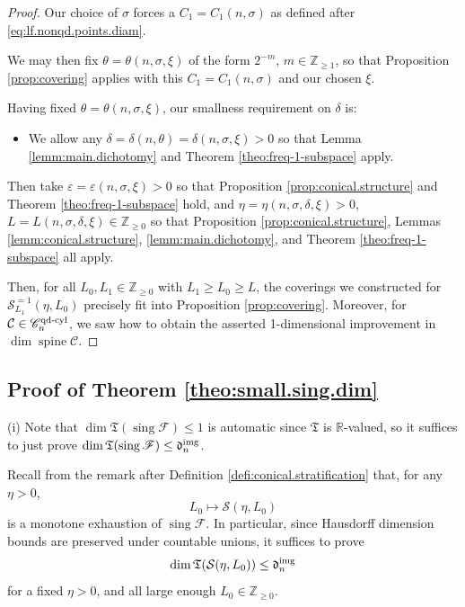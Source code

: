 \documentclass[11pt, letterpaper, reqno]{amsart}
\numberwithin{equation}{section}
\theoremstyle{remark}
\newcommand{\RR}{\mathbb{R}}
\newcommand{\ZZ}{\mathbb{Z}}
\newcommand{\cC}{\mathcal{C}}
\newcommand{\cS}{\mathcal{S}}
\newcommand{\frT}{\mathfrak{T}}
\newcommand{\sing}{\operatorname{sing}}
\newcommand{\spine}{\operatorname{spine}}
\newcommand{\eps}{\varepsilon}
\begin{document}
\begin{proof}
    Our choice of $\sigma$ forces a $C_1 = C_1(n, \sigma)$ as defined after \eqref{eq:lf.nonqd.points.diam}. 
    
    We may then fix $\theta = \theta(n, \sigma, \xi)$ of the form $2^{-m}$, $m \in \ZZ_{\geq 1}$, so that Proposition \ref{prop:covering} applies with this $C_1 = C_1(n, \sigma)$ and our chosen $\xi$. 
    
    Having fixed $\theta = \theta(n, \sigma, \xi)$, our smallness requirement on $\delta$ is:
	\begin{itemize}
		\item We allow any $\delta = \delta(n, \theta) = \delta(n, \sigma, \xi) > 0$ so that Lemma \ref{lemm:main.dichotomy} and Theorem \ref{theo:freq-1-subspace} apply.
	\end{itemize}
	
	Then take $\eps = \eps(n, \sigma, \xi) > 0$ so that Proposition \ref{prop:conical.structure} and Theorem \ref{theo:freq-1-subspace} hold, and $\eta = \eta(n, \sigma, \delta, \xi) > 0$, $L = L(n, \sigma, \delta, \xi) \in \ZZ_{\geq 0}$ so that Proposition \ref{prop:conical.structure}, Lemmas \ref{lemm:conical.structure}, \ref{lemm:main.dichotomy}, and Theorem \ref{theo:freq-1-subspace} all apply.
    
    Then, for all $L_0, L_1 \in \ZZ_{\geq 0}$ with $L_1 \geq L_0 \geq L$, the coverings we constructed for $\cS^{=1}_{L_1}(\eta, L_0)$ precisely fit into Proposition \ref{prop:covering}. Moreover, for $\cC \in \mathscr{C}_n^{\textnormal{qd-cyl}}$, we saw how to obtain the asserted 1-dimensional improvement in $\dim \spine \cC$.
\end{proof}



\subsection{Proof of Theorem \ref{theo:small.sing.dim}}

(i) Note that $\dim \frT(\sing \mathscr{F}) \leq 1$ is automatic since $\frT$ is $\RR$-valued, so it suffices to just prove $\dim \frT(\sing \mathscr{F}) \leq { \mathfrak{d}_{n}^{\textnormal{img}}}$.


Recall from the remark after Definition \ref{defi:conical.stratification} that, for any $\eta > 0$, 
\[ L_0 \mapsto \cS(\eta, L_0) \]
is a monotone exhaustion of $\sing \mathscr{F}$. In particular, since Hausdorff dimension bounds are preserved under countable unions, it suffices to prove
\begin{equation} \label{eq:small.sing.dim.a.wts}
	\dim \frT(\cS(\eta, L_0)) \leq {\mathfrak{d}_{n}^{\textnormal{img}}}
\end{equation}
for a fixed $\eta > 0$, and all large enough $L_0 \in \ZZ_{\geq 0}$.
\end{document}
